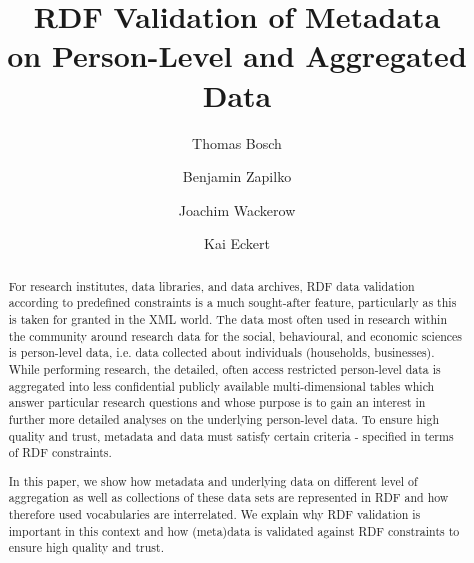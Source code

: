 \documentclass{llncs}
\begin{document}
\renewcommand{\arraystretch}{1.3}
%
%
\title{RDF Validation of Metadata \\ on Person-Level and Aggregated Data}
\subtitle{}

%
\author{Thomas Bosch \and Benjamin Zapilko \and Joachim Wackerow \and Kai Eckert}
%
\authorrunning{} %
%

\maketitle              %

\begin{abstract}
For research institutes, data libraries, and data archives,
RDF data validation according to predefined constraints is a much sought-after feature, 
particularly as this is taken for granted in the XML world.
The data most often used in research within the community around research data for the social, behavioural, and economic sciences is person-level data, i.e. data collected about individuals (households, businesses). 
While performing research, the detailed, often access restricted person-level
data is aggregated into less confidential publicly available multi-dimensional tables which answer particular research questions and whose purpose is to gain an interest in further more detailed analyses on the underlying person-level data.
To ensure high quality and trust, metadata and data must satisfy certain criteria - specified in terms of RDF constraints. 

In this paper, we show how metadata and underlying data on different level of aggregation as well as collections of these data sets are represented in RDF and how therefore used vocabularies are interrelated.
We explain why RDF validation is important in this context and how (meta)data is validated against RDF constraints to ensure high quality and trust. 

\end{abstract}
\end{document}
